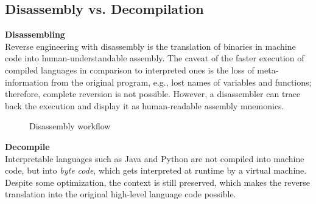 \documentclass[seminar]{plai}
\begin{document}
\subsection{Disassembly vs. Decompilation}
\label{disassembly-vs-decompilation}

\textbf{Disassembling}\\
Reverse engineering with disassembly is the translation of binaries in machine code into human-understandable assembly.
The caveat of the faster execution of compiled languages in comparison to interpreted ones is the loss of meta-information from the original program, e.g., lost names of variables and functions; therefore, complete reversion is not possible.
However, a disassembler can trace back the execution and display it as human-readable assembly mnemonics.\cite{reverse-engineering-vs-disassembly}\\

\begin{figure}[htbp]
\centering
{}
\caption{Disassembly workflow\cite{reverse-engineering-vs-disassembly}}
\label{fig:compile-disassemble}
\end{figure}

\textbf{Decompile}\\
Interpretable languages such as Java and Python are not compiled into machine code, but into \textit{byte code}, which gets interpreted at runtime by a virtual machine. Despite some optimization, the context is still preserved, which makes the reverse translation into the original high-level language code possible.\cite{reverse-engineering-vs-disassembly}
\end{document}
